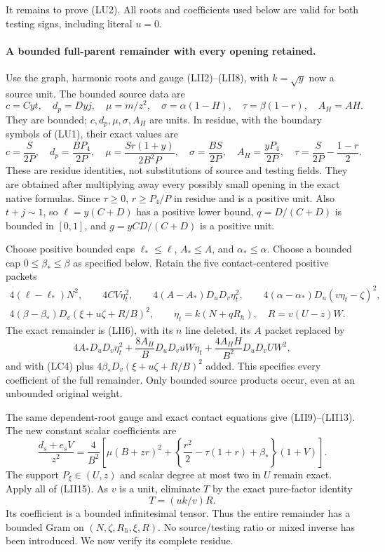 It remains to prove (LU2).  All roots and coefficients used below
are valid for both testing signs, including literal $u=0$.

\paragraph{A bounded full-parent remainder with every opening retained.}
Use the graph, harmonic roots and gauge (LII2)--(LII8), with
$k=\sqrt y$ now a source unit.  The bounded source data are
\[
 c=Cyt,\quad d_p=Dyj,\quad
 \mu=m/z^2,\quad \sigma=\alpha(1-H),\quad
 \tau=\beta(1-r),\quad A_H=AH.
\]
They are bounded; $c,d_p,\mu,\sigma,A_H$ are units.  In residue,
with the boundary symbols of (LU1), their exact values are
\[
 c=\frac S{2P},\quad d_p=\frac{BP_4}{2P},\quad
 \mu=\frac{Sr(1+y)}{2B^2P},\quad
 \sigma=\frac{BS}{2P},\quad A_H=\frac{yP_4}{2P},\quad
 \tau=\frac S{2P}-\frac{1-r}{2}.                         \tag{LU3}
\]
These are residue identities, not substitutions of source and
testing fields.  They are obtained after multiplying away every
possibly small opening in the exact native formulas.
Since $\tau\ge0$, $r\ge P_4/P$ in residue and is a positive unit.
Also $t+j\sim1$, so $\ell=y(C+D)$ has a positive lower bound,
$q=D/(C+D)$ is bounded in $[0,1]$, and
$g=yCD/(C+D)$ is a positive unit.

Choose positive bounded caps $\ell_*\le\ell$,
$A_*\le A$, and $\alpha_*\le\alpha$.  Choose a bounded cap
$0\le\beta_*\le\beta$ as specified below.  Retain the five
contact-centered positive packets
\[
\begin{gathered}
 4(\ell-\ell_*)N^2,\qquad 4CV\eta_t^2,\qquad
 4(A-A_*)D_uD_v\eta_t^2,\qquad
 4(\alpha-\alpha_*)D_u(v\eta_t-\zeta)^2,\\
 4(\beta-\beta_*)D_v(\xi+u\zeta+R/B)^2,
 \qquad \eta_t=k(N+qR_h),\quad R=v(U-z)W.
\end{gathered}
\tag{LU4}
\]
The exact remainder is (LII6), with its $n$ line deleted, its $A$
packet replaced by
\[
 4A_*D_uD_v\eta_t^2
 +\frac{8A_H}B D_uD_vuW\eta_t
 +\frac{4A_HH}{B^2}D_uD_vUW^2,
                                                               \tag{LU5}
\]
and with (LC4) plus $4\beta_*D_v(\xi+u\zeta+R/B)^2$ added.
This specifies every coefficient of the full remainder.  Only
bounded source products occur, even at an unbounded original weight.

The same dependent-root gauge and exact contact equations give
(LII9)--(LII13).  The new constant scalar coefficients are
\[
 \frac{d_s+e_sV}{z^2}=
 \frac4{B^2}\left[
 \mu(B+zr)^2+
 \left\{\frac{r^2}{2}-\tau(1+r)+\beta_*\right\}(1+V)
 \right].                                                   \tag{LU6}
\]
The support $P_\xi\in(U,z)$ and scalar degree at most two in $U$
remain exact.  Apply all of (LII15).  As $v$ is a unit, eliminate
$T$ by the exact pure-factor identity
\[
                        T=(uk/v)R.                         \tag{LU7}
\]
Its coefficient is a bounded infinitesimal tensor.  Thus the entire
remainder has a bounded Gram on
$(N,\zeta,R_h,\xi,R)$.  No source/testing ratio or mixed inverse
has been introduced.  We now verify its complete residue.

